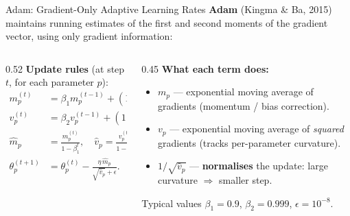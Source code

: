\documentclass[aspectratio=169, 10pt]{beamer}
\newcommand{\highlight}[1]{\textcolor{blue!70!black}{\textbf{#1}}}
\begin{document}
\begin{frame}{Adam: Gradient-Only Adaptive Learning Rates}
  \textbf{Adam} (Kingma \& Ba, 2015) maintains running estimates of the first and second
  moments of the gradient vector, using only gradient information:

  \vspace{0.3em}
  \begin{columns}[T]
    \begin{column}{0.52\textwidth}
      \textbf{Update rules} (at step $t$, for each parameter $p$):
      \begin{align*}
        m_p^{(t)} &= \beta_1 m_p^{(t-1)} + (1-\beta_1)\,g_p^{(t)}, \\
        v_p^{(t)} &= \beta_2 v_p^{(t-1)} + (1-\beta_2)\,\bigl(g_p^{(t)}\bigr)^2, \\
        \hat m_p   &= \frac{m_p^{(t)}}{1-\beta_1^t}, \quad
        \hat v_p   = \frac{v_p^{(t)}}{1-\beta_2^t}, \\
        \theta_p^{(t+1)} &= \theta_p^{(t)} - \frac{\eta\,\hat m_p}{\sqrt{\hat v_p}+\epsilon}.
      \end{align*}
    \end{column}
    \begin{column}{0.45\textwidth}
      \textbf{What each term does:}
      \begin{itemize}
        \item $m_p$ — exponential moving average of gradients (momentum / bias correction).
        \item $v_p$ — exponential moving average of \emph{squared} gradients (tracks per-parameter curvature).
        \item $1/\sqrt{\hat v_p}$ — \highlight{normalises} the update: large curvature $\Rightarrow$ smaller step.
      \end{itemize}
      \begin{block}{\small Typical values}
        $\beta_1=0.9$,\; $\beta_2=0.999$,\; $\epsilon=10^{-8}$.
      \end{block}
    \end{column}
  \end{columns}
\end{frame}
\end{document}

